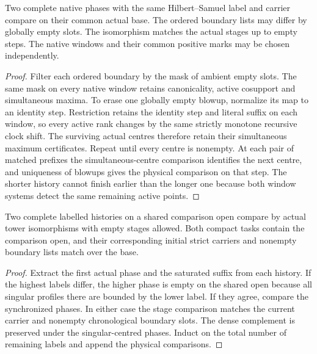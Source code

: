 \begin{theorem}
\label{hir:g8-native-simultaneous-terminal-comparison}
Two complete native phases with the same Hilbert--Samuel label and
carrier compare on their common actual base. The ordered boundary
lists may differ by globally empty slots. The isomorphism matches the
actual stages up to empty steps. The native windows and their common
positive marks may be chosen independently.
\end{theorem}

\begin{proof}
Filter each ordered boundary by the mask of ambient empty slots. The
same mask on every native window retains canonicality, active cosupport
and simultaneous maxima. To erase one globally empty blowup, normalize
its map to an identity step. Restriction retains the identity step and
literal suffix on each window, so every active rank changes by the
same strictly monotone recursive clock shift. The surviving actual
centres therefore retain their simultaneous maximum certificates.
Repeat until every centre is nonempty. At each pair of matched
prefixes the simultaneous-centre comparison identifies the next centre,
and uniqueness of blowups gives the physical comparison on that step.
The shorter history cannot finish earlier than the longer one because
both window systems detect the same remaining active points.
\end{proof}

\begin{theorem}
\label{hir:g8-labelled-native-whole-overlap}
Two complete labelled histories on a shared comparison open compare
by actual tower isomorphisms with empty stages allowed. Both compact
tasks contain the comparison open, and their corresponding initial
strict carriers and nonempty boundary lists match over the base.
\end{theorem}

\begin{proof}
Extract the first actual phase and the saturated suffix from each
history. If the highest labels differ, the higher phase is empty
on the shared open because all singular profiles there are bounded
by the lower label. If they agree, compare the synchronized phases.
In either case the stage comparison matches the current carrier and
nonempty chronological boundary slots. The dense complement is
preserved under the singular-centred phases. Induct on the total
number of remaining labels and append the physical comparisons.
\end{proof}

